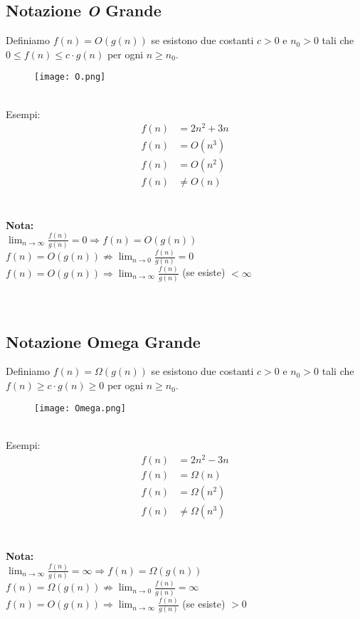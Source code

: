 \documentclass{article}
\begin{document}
\subsection{Notazione \textit{O} Grande}
Definiamo $f(n) = O(g(n))$ se esistono due costanti $c > 0$ e $n_0 > 0$ tali che $0 \leq f(n) \leq c \cdot g(n)$ per ogni $n \geq n_0$.
\begin{figure}[h]
  \centering
  \texttt{[image: O.png]}
\end{figure}
\\  
Esempi:
\begin{align}
    f(n) &= 2n^2 + 3n \\
    f(n) &= O(n^3) \\
    f(n) &= O(n^2) \\
    f(n) &\neq O(n)
\end{align}
\\\\
\textbf{Nota:} \\
$\lim_{n\to\infty} \frac{f(n)}{g(n)} = 0 \Rightarrow f(n) = O(g(n))$ \\
$f(n) = O(g(n)) \not\Rightarrow \lim_{n\to 0} \frac{f(n)}{g(n)} = 0$ \\
$f(n) = O(g(n)) \Rightarrow \lim_{n\to\infty} \frac{f(n)}{g(n)}$ (se esiste) $< \infty$
\\\\\\
\subsection{Notazione Omega Grande}
Definiamo $f(n) = \Omega(g(n))$ se esistono due costanti $c > 0$ e $n_0 > 0$ tali che $f(n) \geq c \cdot g(n) \geq 0$ per ogni $n \geq n_0$.
\begin{figure}[h]
  \centering
  \texttt{[image: Omega.png]}
\end{figure}
\\
Esempi:
\begin{align}
    f(n) &= 2n^2 - 3n \\
    f(n) &= \Omega(n) \\
    f(n) &= \Omega(n^2) \\
    f(n) &\neq \Omega(n^3)
\end{align}
\\\\
\textbf{Nota:} \\
$\lim_{n\to\infty} \frac{f(n)}{g(n)} = \infty \Rightarrow f(n) = \Omega(g(n))$ \\
$f(n) = \Omega(g(n)) \not\Rightarrow \lim_{n\to 0} \frac{f(n)}{g(n)} = \infty$ \\
$f(n) = O(g(n)) \Rightarrow \lim_{n\to\infty} \frac{f(n)}{g(n)}$ (se esiste) $> 0$
\end{document}
